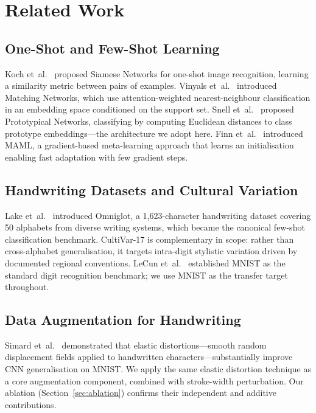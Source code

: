 \documentclass[final,5p,times,twocolumn]{elsarticle}
\begin{document}
\section{Related Work}

\subsection{One-Shot and Few-Shot Learning}

Koch et~al.\ \cite{Koch2015} proposed Siamese Networks for one-shot image recognition,
learning a similarity metric between pairs of examples.
Vinyals et~al.\ \cite{Vinyals2016} introduced Matching Networks, which use
attention-weighted nearest-neighbour classification in an embedding space conditioned on the
support set.
Snell et~al.\ \cite{Snell2017} proposed Prototypical Networks, classifying by computing
Euclidean distances to class prototype embeddings—the architecture we adopt here.
Finn et~al.\ \cite{Finn2017} introduced MAML, a gradient-based meta-learning approach that
learns an initialisation enabling fast adaptation with few gradient steps.

\subsection{Handwriting Datasets and Cultural Variation}

Lake et~al.\ \cite{Lake2015} introduced Omniglot, a 1{,}623-character handwriting dataset
covering 50 alphabets from diverse writing systems, which became the canonical few-shot
classification benchmark.
CultiVar-17 is complementary in scope: rather than cross-alphabet generalisation, it targets
intra-digit stylistic variation driven by documented regional conventions.
LeCun et~al.\ \cite{LeCun1998} established MNIST as the standard digit recognition
benchmark; we use MNIST as the transfer target throughout.

\subsection{Data Augmentation for Handwriting}

Simard et~al.\ \cite{Simard2003} demonstrated that elastic distortions—smooth random
displacement fields applied to handwritten characters—substantially improve CNN
generalisation on MNIST.
We apply the same elastic distortion technique as a core augmentation component, combined
with stroke-width perturbation.
Our ablation (Section~\ref{sec:ablation}) confirms their independent and additive
contributions.
\end{document}
